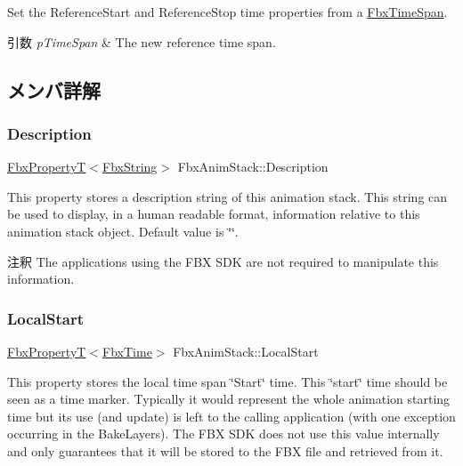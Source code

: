 Set the Reference\+Start and Reference\+Stop time properties from a \hyperlink{class_fbx_time_span}{Fbx\+Time\+Span}. 
\begin{DoxyParams}{引数}
{\em p\+Time\+Span} & The new reference time span. \\
\hline
\end{DoxyParams}


\subsection{メンバ詳解}
\mbox{\label{class_fbx_anim_stack_a87abfeabeaa31a44e2474f01d4501b7f}} 
\subsubsection{\texorpdfstring{Description}{Description}}
{\footnotesize\ttfamily \hyperlink{class_fbx_property_t}{Fbx\+PropertyT}$<$\hyperlink{class_fbx_string}{Fbx\+String}$>$ Fbx\+Anim\+Stack\+::\+Description}

This property stores a description string of this animation stack. This string can be used to display, in a human readable format, information relative to this animation stack object. Default value is \char`\"{}\char`\"{}. \begin{DoxyRemark}{注釈}
The applications using the F\+BX S\+DK are not required to manipulate this information. 
\end{DoxyRemark}
\mbox{\label{class_fbx_anim_stack_a140ba636c0907144d60d2901c0995456}} 
\subsubsection{\texorpdfstring{Local\+Start}{LocalStart}}
{\footnotesize\ttfamily \hyperlink{class_fbx_property_t}{Fbx\+PropertyT}$<$\hyperlink{class_fbx_time}{Fbx\+Time}$>$ Fbx\+Anim\+Stack\+::\+Local\+Start}

This property stores the local time span \char`\"{}\+Start\char`\"{} time. This \char`\"{}start\char`\"{} time should be seen as a time marker. Typically it would represent the whole animation starting time but its use (and update) is left to the calling application (with one exception occurring in the Bake\+Layers). The F\+BX S\+DK does not use this value internally and only guarantees that it will be stored to the F\+BX file and retrieved from it.

